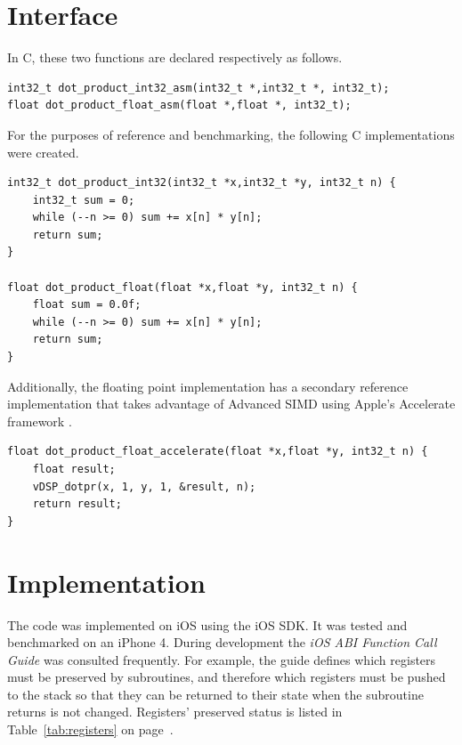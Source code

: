 \documentclass[oneside,a4paper]{report}
\begin{document}
\section{Interface}

In C, these two functions are declared respectively as follows.

\begin{singlespacing}
\begin{lstlisting}[language={AssemblerC}]
int32_t dot_product_int32_asm(int32_t *,int32_t *, int32_t);
float dot_product_float_asm(float *,float *, int32_t);
\end{lstlisting}
\end{singlespacing}

For the purposes of reference and benchmarking, the following C implementations were created.

\begin{singlespacing}
\begin{lstlisting}[language={AssemblerC}]
int32_t dot_product_int32(int32_t *x,int32_t *y, int32_t n) {
    int32_t sum = 0;
    while (--n >= 0) sum += x[n] * y[n];
    return sum;
}

float dot_product_float(float *x,float *y, int32_t n) {
    float sum = 0.0f;
    while (--n >= 0) sum += x[n] * y[n];
    return sum;
}
\end{lstlisting}
\end{singlespacing}

Additionally, the floating point implementation has a secondary reference implementation that takes advantage of Advanced SIMD using Apple's Accelerate framework \cite{Accelerate}.

\begin{singlespacing}
\begin{lstlisting}[language={AssemblerC}]
float dot_product_float_accelerate(float *x,float *y, int32_t n) {
    float result;
    vDSP_dotpr(x, 1, y, 1, &result, n);
    return result;
}
\end{lstlisting}
\end{singlespacing}

\section{Implementation}
The code was implemented on iOS using the iOS SDK. It was tested and benchmarked on an iPhone 4. During development the \emph{iOS ABI Function Call Guide} \cite{iOSABI} was consulted frequently. For example, the guide defines which registers must be preserved by subroutines, and therefore which registers must be pushed to the stack so that they can be returned to their state when the subroutine returns is not changed. Registers' preserved status is listed in Table~\ref{tab:registers} on page~\pageref{tab:registers}.
\end{document}
